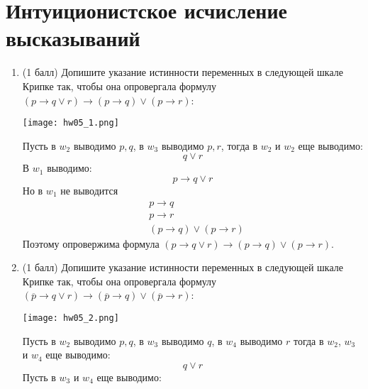 \section{Интуиционистское исчисление высказываний}
\begin{enumerate}
    \item (1 балл) Допишите указание истинности переменных в следующей шкале Крипке так,
    чтобы она опровергала формулу $(p \rightarrow q \lor r) \rightarrow (p \rightarrow q) \lor (p \rightarrow r)$:
    \begin{center}
        \texttt{[image: hw05\_1.png]}
    \end{center}
    \begin{solution}
        Пусть в $w_2$ выводимо $p, q$, в $w_3$ выводимо $p, r$, тогда в $w_2$ и $w_2$ еще выводимо:
        \begin{equation}
            q \lor r
        \end{equation}
        В $w_1$ выводимо:
        \begin{equation}
            p \rightarrow q \lor r
        \end{equation}
        Но в $w_1$ не выводится
        \begin{align*}
            &p \rightarrow q \\
            &p \rightarrow r \\
            &(p \rightarrow q) \lor (p \rightarrow r)
        \end{align*}
        Поэтому опровержима формула $(p \rightarrow q \lor r) \rightarrow (p \rightarrow q) \lor (p \rightarrow r)$.
    \end{solution}
    \item (1 балл) Допишите указание истинности переменных в следующей шкале Крипке так,
    чтобы она опровергала формулу $(\overline{p} \rightarrow q \lor r) \rightarrow (\overline{p} \rightarrow q) \lor (\overline{p} \rightarrow r)$:
    \begin{center}
        \texttt{[image: hw05\_2.png]}
    \end{center}
    \begin{solution}
        Пусть в $w_2$ выводимо $p, q$, в $w_3$ выводимо $q$, в $w_4$ выводимо $r$ тогда в $w_2$, $w_3$ и $w_4$ еще выводимо:
        \begin{equation}
            q \lor r
        \end{equation}
        Пусть в $w_3$ и $w_4$ еще выводимо:
        \begin{equation}

\end{equation}
\end{solution}
\end{enumerate}
